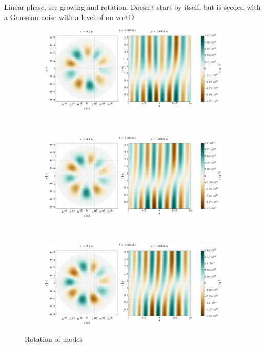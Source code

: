 %
Linear phase, see growing and rotation.
Doesn't start by itself, but is seeded with a Gaussian noise with a level of on vortD
%
\begin{figure}[htbp]
    \centering
    \begin{subfigure}[h]{1.00\textwidth}
        \centering
        \includegraphics[width=1.0\textwidth]{fig/results/rotModes/n-perpPol-2D-fluct-0}
        \label{fig:rot1}
    \end{subfigure}%
    \\
    \begin{subfigure}[h]{1.00\textwidth}
        \centering
        \includegraphics[width=1.0\textwidth]{fig/results/rotModes/n-perpPol-2D-fluct-1}
        \label{fig:rot2}
    \end{subfigure}
    \\
    \begin{subfigure}[h]{1.00\textwidth}
        \centering
        \includegraphics[width=1.0\textwidth]{fig/results/rotModes/n-perpPol-2D-fluct-2}
        \label{fig:rot3}
    \end{subfigure}
    \caption{Rotation of modes}
\end{figure}
